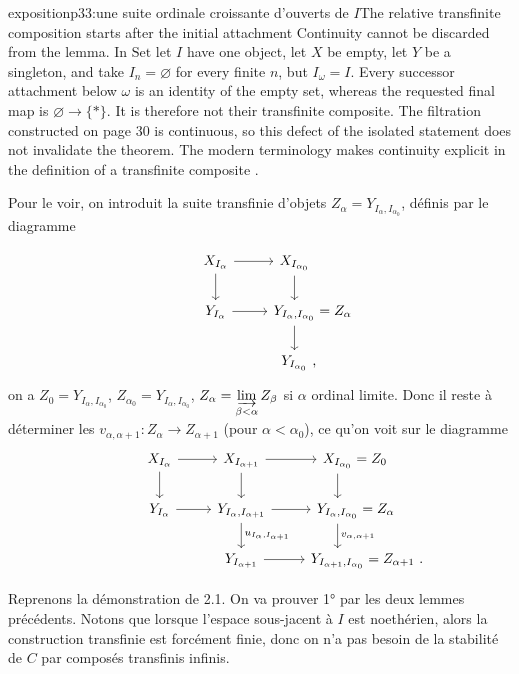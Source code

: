 \begin{dcomment}{exposition}{p33:une suite ordinale croissante d'ouverts de $I$}{The relative transfinite composition starts after the initial attachment}
Continuity cannot be discarded from the lemma. In $\mathrm{Set}$ let $I$ have one object, let $X$ be empty, let $Y$ be a singleton, and take $I_n=\varnothing$ for every finite $n$, but $I_\omega=I$. Every successor attachment below $\omega$ is an identity of the empty set, whereas the requested final map is $\varnothing\to\{*\}$. It is therefore not their transfinite composite. The filtration constructed on page 30 is continuous, so this defect of the isolated statement does not invalidate the theorem. The modern terminology makes continuity explicit in the definition of a transfinite composite \citep[Definition 5.3]{RiehlVerity2014Reedy}.
\end{dcomment}


Pour le voir, on introduit la suite transfinie d'objets $Z_\alpha = Y_{I_\alpha,I_{\alpha_0}}$, définis par le diagramme


\[
\begin{tikzcd}
X_{I_\alpha} \arrow[r] \arrow[d] & X_{I_{\alpha_0}} \arrow[d] \\
Y_{I_\alpha} \arrow[r] & Y_{I_\alpha,I_{\alpha_0}} \rlap{${}= Z_\alpha$} \arrow[d] \\
& Y_{I_{\alpha_0}} \rlap{\ ,}
\end{tikzcd}
\]
on a $Z_0 = Y_{I_\alpha,I_{\alpha_0}}$, $Z_{\alpha_0} = Y_{I_\alpha,I_{\alpha_0}}$, $Z_\alpha = \varinjlim\limits_{\beta<\alpha} Z_\beta$ si $\alpha$  ordinal limite. Donc il reste à déterminer les $v_{\alpha,\alpha+1} : Z_\alpha \longrightarrow Z_{\alpha+1}$ (pour $\alpha < \alpha_0$), ce qu'on voit sur le diagramme
\[
\begin{tikzcd}
X_{I_\alpha} \arrow[r] \arrow[d] & X_{I_{\alpha+1}} \arrow[r] \arrow[d] & X_{I_{\alpha_0}} \rlap{${}= Z_0$} \arrow[d] \\
Y_{I_\alpha} \arrow[r] & Y_{I_\alpha,I_{\alpha+1}} \arrow[r] \arrow[d, "u_{I_\alpha,I_{\alpha+1}}"] & Y_{I_\alpha,I_{\alpha_0}} \rlap{${}= Z_\alpha$} \arrow[d, "v_{\alpha,\alpha+1}"] \\
& Y_{I_{\alpha+1}} \arrow[r] & Y_{I_{\alpha+1},I_{\alpha_0}} \rlap{${}= Z_{\alpha+1}\ .$}
\end{tikzcd}
\]

Reprenons la démonstration de 2.1. On va prouver 1° par les deux lemmes précédents. Notons que lorsque l'espace sous-jacent à $I$ est noethérien, alors la construction transfinie est forcément finie, donc on n'a pas besoin de la stabilité de $C$ par composés transfinis infinis.

